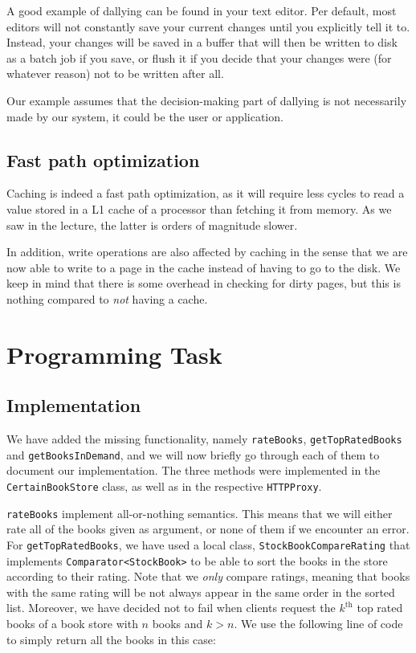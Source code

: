 \documentclass[11pt]{article}
\begin{document}
A good example of dallying can be found in your text editor. Per default, most
editors will not constantly save your current changes until you explicitly
tell it to. Instead, your changes will be saved in a buffer that will then be
written to disk as a batch job if you save, or flush it if you decide that your
changes were (for whatever reason) not to be written after all.

Our example assumes that the decision-making part of dallying is not necessarily
made by our system, it could be the user or application.

\subsection*{Fast path optimization}

Caching is indeed a fast path optimization, as it will require less cycles to
read a value stored in a L1 cache of a processor than fetching it from memory.
As we saw in the lecture, the latter is orders of magnitude slower.

In addition, write operations are also affected by caching in the sense that
we are now able to write to a page in the cache instead of having to go to the
disk.
We keep in mind that there is some overhead in checking for dirty pages, but
this is nothing compared to \emph{not} having a cache.


\section*{Programming Task}

\subsection*{Implementation}
We have added the missing functionality, namely \texttt{rateBooks},
\texttt{getTopRatedBooks} and \texttt{getBooksInDemand}, and we will now briefly go through each of them to document our implementation.
The three methods were implemented in the \texttt{CertainBookStore} class, as
well as in the respective \texttt{HTTPProxy}.

\texttt{rateBooks} implement all-or-nothing semantics. This means that we will
either rate all of the books given as argument, or none of them if we encounter
an error.
For \texttt{getTopRatedBooks}, we have used a local class,
\texttt{StockBookCompareRating} that implements \texttt{Comparator<StockBook>}
to be able to sort the books in the store according to their rating. Note that
we \emph{only} compare ratings, meaning that books with the same rating will be
not always appear in the same order in the sorted list.
Moreover, we have decided not to fail when clients request the $k^{\text{th}}$
top rated books of a book store with $n$ books and $k>n$. We use the following
line of code to simply return all the books in this case:
\end{document}
